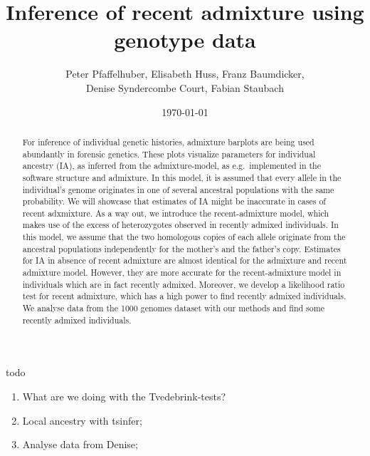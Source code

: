 \documentclass[12pt]{article}
\theoremstyle{definition}
\begin{document}
\title{\LARGE Inference of recent admixture using genotype data}

\author{\sc Peter Pfaffelhuber, Elisabeth Huss, Franz Baumdicker, \\
  \sc Denise Syndercombe Court, Fabian Staubach}

\date{\today}

\maketitle

{\color{blue}
{\sc todo}
\begin{enumerate}
\item What are we doing with the Tvedebrink-tests?
\item Local ancestry with tsinfer;
\item Analyse data from Denise;
\end{enumerate}
}

\begin{abstract}
  \noindent
  For inference of individual genetic histories, admixture barplots
  are being used abundantly in forensic genetics. These plots
  visualize parameters for individual ancestry (IA), as inferred from
  the admixture-model, as e.g.\ implemented in the software {\sc
    structure} and {\sc admixture}. In this model, it is assumed that
  every allele in the individual's genome originates in one of several
  ancestral populations with the same probability. We will showcase
  that estimates of IA might be inaccurate in cases of recent
  adxmixture. As a way out, we introduce the recent-admixture model,
  which makes use of the excess of heterozygotes observed in recently
  admixed individuals. In this model, we assume that the two
  homologous copies of each allele originate from the ancestral
  populations independently for the mother's and the father's
  copy. Estimates for IA in absence of recent admixture are almost
  identical for the admixture and recent admixture model. However,
  they are more accurate for the recent-admixture model in individuals
  which are in fact recently admixed. Moreover, we develop a
  likelihood ratio test for recent admixture, which has a high power
  to find recently admixed individuals. We analyse data from the 1000
  genomes dataset with our methods and find some recently admixed
  individuals.
\end{abstract}
\end{document}
